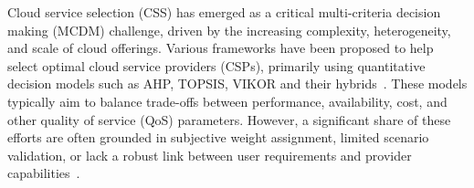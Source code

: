 \documentclass[twocolumn]{svjour3}
\begin{document}
Cloud service selection (CSS) has emerged as a critical multi-criteria decision making (MCDM) challenge, driven by the increasing complexity, heterogeneity, and scale of cloud offerings. Various frameworks have been proposed to help select optimal cloud service providers (CSPs), primarily using quantitative decision models such as AHP, TOPSIS, VIKOR and their hybrids~\cite{whaiduzzaman2014cloud,sun2019framework}. These models typically aim to balance trade-offs between performance, availability, cost, and other quality of service (QoS) parameters. However, a significant share of these efforts are often grounded in subjective weight assignment, limited scenario validation, or lack a robust link between user requirements and provider capabilities~\cite{vakili2019cloud,sun2016cloud}.
\end{document}
